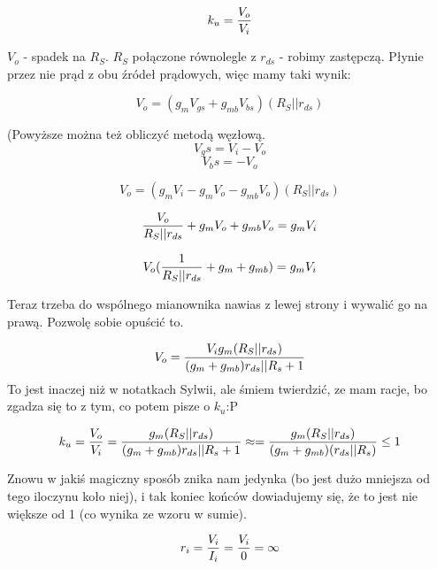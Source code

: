 \documentclass[10pt,a4paper]{article}
\begin{document}
\begin{equation}
k_u = {V_o \over V_i}
\end{equation}

$V_o$ - spadek na $R_S$. $R_S$ połączone równolegle z $r_{ds}$ - robimy zastępczą. Płynie przez nie prąd z obu źródeł prądowych, więc mamy taki wynik:

\begin{equation}
V_o = {(g_mV_{gs} + g_{mb}V_{bs})(R_S || r_{ds})}
\end{equation}

(Powyższe można też obliczyć metodą węzłową.
\begin{equation}
V_gs = V_i - V_o
\end{equation}
\begin{equation}
V_bs = - V_o
\end{equation}

\begin{equation}
V_o = {(g_mV_i - g_mV_o - g_{mb}V_{o})(R_S || r_{ds})}
\end{equation}

\begin{equation}
{V_o \over R_S || r_{ds}} + g_mV_o + g_{mb}V_{o}= {g_mV_i }
\end{equation}

\begin{equation}
{V_o ({1\over R_S || r_{ds}} + g_m + g_{mb})= g_mV_i }
\end{equation}

Teraz trzeba do wspólnego mianownika nawias z lewej strony i wywalić go na prawą. Pozwolę sobie opuścić to. 

\begin{equation}
V_o = {V_ig_m(R_S || r_{ds}) \over (g_m + g_{mb})r_{ds}||R_s + 1}
\end{equation}
To jest inaczej niż w notatkach Sylwii, ale śmiem twierdzić, ze mam racje, bo zgadza się to z tym, co potem pisze o $k_u$:P

\begin{equation}
k_u = {V_o \over V_i} = {g_m(R_S || r_{ds}) \over (g_m + g_{mb})r_{ds}||R_s + 1} \approx = {g_m(R_S || r_{ds}) \over (g_m + g_{mb})(r_{ds}||R_s)} \leq 1
\end{equation}

Znowu w jakiś magiczny sposób znika nam jedynka (bo jest dużo mniejsza od tego iloczynu koło niej), i tak koniec końców dowiadujemy się, że to jest nie większe od 1 (co wynika ze wzoru w sumie).

\begin{equation}
r_i = {V_i \over I_i} = {V_i \over 0} = \infty
\end{equation}
\end{document}

